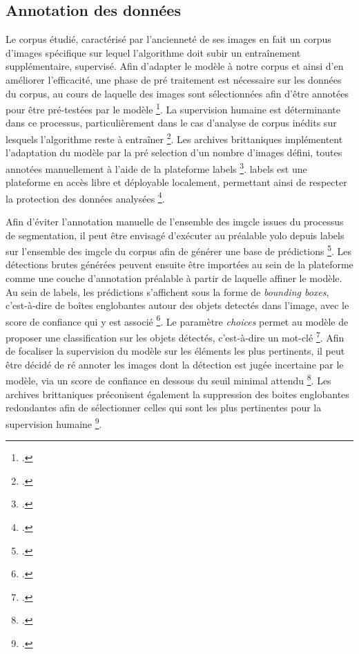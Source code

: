 \subsection{Annotation des données}
Le corpus étudié, caractérisé par l'ancienneté de ses images en fait un corpus d’images spécifique sur lequel l’algorithme doit subir un entraînement supplémentaire, supervisé. Afin d'adapter le modèle à notre corpus et ainsi d'en améliorer l'efficacité, une phase de pré traitement est nécessaire sur les données du corpus, au cours de laquelle des images sont sélectionnées afin d’être annotées pour être pré-testées par le modèle \footcite{kasturi2024}. La supervision humaine est déterminante dans ce processus, particulièrement dans le cas d’analyse de corpus inédits sur lesquels l’algorithme reste à entraîner \footcite{kasturi2024}. 
Les archives brittaniques implémentent l'adaptation du modèle par la pré selection d'un nombre d'images défini, toutes annotées manuellement à l'aide de la plateforme \gls{labels} \footcite{kasturi2024}. \gls{labels} est une plateforme en accès libre et déployable localement, permettant ainsi de respecter la protection des données analysées \footcite{zotero-item-783}.

Afin d'éviter l'annotation manuelle de l'ensemble des \gls{imgcle} issues du processus de segmentation, il peut être envisagé d'exécuter au préalable \gls{yolo} depuis \gls{labels} sur l'ensemble des \gls{imgcle} du corpus afin de générer une base de prédictions \footcite{development2025}. Les détections brutes générées peuvent ensuite être importées au sein de la plateforme comme une couche d'annotation préalable à partir de laquelle affiner le modèle. Au sein de \gls{labels}, les prédictions s'affichent sous la forme de \textit{bounding boxes}, c'est-à-dire de boîtes englobantes autour des objets detectés dans l'image, avec le score de confiance qui y est associé \footcite{kasturi2024}. Le paramètre \textit{choices} permet au modèle de proposer une classification sur les objets détectés, c'est-à-dire un mot-clé \footcite{zotero-item-785}. Afin de focaliser la supervision du modèle sur les éléments les plus pertinents, il peut être décidé de ré annoter les images dont la détection est jugée incertaine par le modèle, via un score de confiance en dessous du seuil minimal attendu \footcite{development2025}. Les archives brittaniques préconisent également la suppression des boites englobantes redondantes afin de sélectionner celles qui sont les plus pertinentes pour la supervision humaine \footcite{kasturi2024}. 

